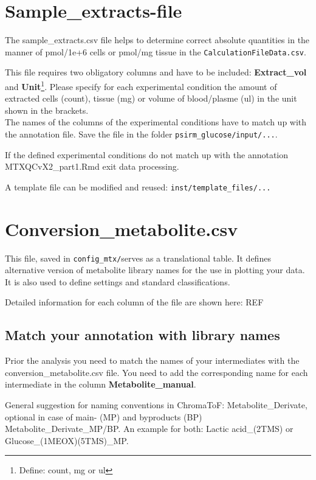 \documentclass[]{book}
\let\rmarkdownfootnote\footnote%
\def\footnote{\protect\rmarkdownfootnote}
\theoremstyle{definition}
\theoremstyle{definition}
\theoremstyle{definition}
\theoremstyle{remark}
\begin{document}
\section{Sample\_extracts-file}\label{sample_extracts-file-1}

The sample\_extracts.csv file helps to determine correct absolute
quantities in the manner of pmol/1e+6 cells or pmol/mg tissue in the
\texttt{CalculationFileData.csv}.

This file requires two obligatory columns and have to be included:
\textbf{Extract\_vol} and \textbf{Unit}\footnote{Define: count, mg or ul}.
Please specify for each experimental condition the amount of extracted
cells (count), tissue (mg) or volume of blood/plasme (ul) in the unit
shown in the brackets.\\
The names of the columns of the experimental conditions have to match up
with the annotation file. Save the file in the folder
\texttt{psirm\_glucose/input/...}.

If the defined experimental conditions do not match up with the
annotation MTXQCvX2\_part1.Rmd exit data processing.

A template file can be modified and reused:
\texttt{inst/template\_files/...}

\section{Conversion\_metabolite.csv}\label{conversion_metabolite.csv}

This file, saved in \texttt{config\_mtx/}serves as a translational
table. It defines alternative version of metabolite library names for
the use in plotting your data. It is also used to define settings and
standard classifications.

Detailed information for each column of the file are shown here: REF

\subsection{Match your annotation with library
names}\label{match-your-annotation-with-library-names}

Prior the analysis you need to match the names of your intermediates
with the conversion\_metabolite.csv file. You need to add the
corresponding name for each intermediate in the column
\textbf{Metabolite\_manual}.

General suggestion for naming conventions in ChromaToF:
Metabolite\_Derivate, optional in case of main- (MP) and byproducts (BP)
Metabolite\_Derivate\_MP/BP. An example for both: Lactic acid\_(2TMS) or
Glucose\_(1MEOX)(5TMS)\_MP.
\end{document}
